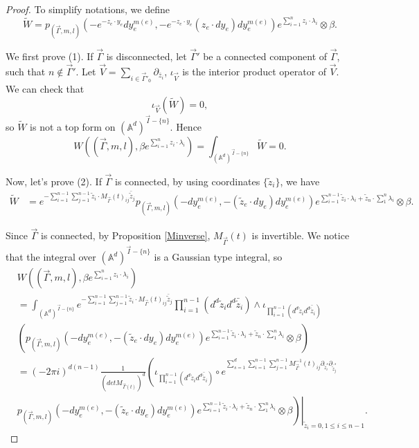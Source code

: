 \documentclass[11pt]{amsart}
\theoremstyle{definition}
\theoremstyle{remark}
\numberwithin{equation}{section}
\begin{document}
\begin{proof}
    To simplify notations, we define
    $$
    \tilde{W}=p_{(\vec{\Gamma},m,l)}(-e^{-z_{e}\cdot y_{e}}dy_{e}^{m(e)},-e^{-z_{e}\cdot y_{e}}(z_{e}\cdot dy_{e})dy_{e}^{m(e)})e^{\sum_{i=1}^{n}z_{i}\cdot\lambda_{i}}\otimes \beta.
    $$

    We first prove (1). If $\vec{\Gamma}$ is disconnected, let $\vec{\Gamma}'$ be a connected component of $\vec{\Gamma}$, such that $n\notin \vec{\Gamma}'$. Let $\vec{V}=\sum_{i\in\vec{\Gamma}'_{0}}\partial_{\bar{z}_{i}}$, $\iota_{\vec{V}}$ is the interior product operator of $\vec{V}$. We can check that
    $$
    \iota_{\vec{V}}(\tilde{W})=0,
    $$
    so $\tilde{W}$ is not a top form on $(\mathbb{A}^d)^{\vec{I}-\{n\}}$. Hence $$
    W((\vec{\Gamma},m,l),\beta e^{\sum_{i=1}^{n}z_{i}\cdot\lambda_{i}})=\int_{(\mathbb{A}^{d})^{\vec{I}-\{n\}}}\tilde{W}=0.
    $$

    Now, let's prove (2). If $\vec{\Gamma}$ is connected, by using coordinates $\{\tilde{z}_{i}\}$, we have
    \begin{align*}
        \tilde{W}&=e^{-\sum_{i=1}^{n-1}\sum_{j=1}^{n-1}\tilde{z}_{i}\cdot M_{\vec{\Gamma}}(t)_{ij}\bar{\tilde{z}}_{j}}p_{(\vec{\Gamma},m,l)}(-dy_{e}^{m(e)},-(\tilde{z}_{e}\cdot dy_{e})dy_{e}^{m(e)})e^{\sum_{i=1}^{n-1}\tilde{z}_{i}\cdot\lambda_{i}+\tilde{z}_{n}\cdot\sum_{1}^{n}\lambda_{i}}\otimes \beta.
    \end{align*}

    Since $\vec{\Gamma}$ is connected, by Proposition \ref{Minverse}, $M_{\vec{\Gamma}}(t)$ is invertible. We notice that the integral over $(\mathbb{A}^d)^{\vec{I}-\{n\}}$ is a Gaussian type integral, so
    \begin{align*}
        &W((\vec{\Gamma},m,l),\beta e^{\sum_{i=1}^{n}z_{i}\cdot\lambda_{i}})\\
        &=\int_{(\mathbb{A}^d)^{\vec{I}-\{n\}}}e^{-\sum_{i=1}^{n-1}\sum_{j=1}^{n-1}\tilde{z}_{i}\cdot M_{\vec{\Gamma}}(t)_{ij}\bar{\tilde{z}}_{j}}\prod_{i=1}^{n-1}(d^{d}\tilde{z}_{i}d^{d}\bar{\tilde{z}}_{i})\wedge \iota_{\prod_{i=1}^{n-1}(d^{d}\tilde{z}_{i}d^{d}\bar{\tilde{z}}_{i})}\\
        &\left(p_{(\vec{\Gamma},m,l)}(-dy_{e}^{m(e)},-(\tilde{z}_{e}\cdot dy_{e})dy_{e}^{m(e)})e^{\sum_{i=1}^{n-1}\tilde{z}_{i}\cdot\lambda_{i}+\tilde{z}_{n}\cdot\sum_{1}^{n}\lambda_{i}}\otimes \beta\right)\\
        &=(-2\pi i)^{d(n-1)}\frac{1}{(detM_{\vec{\Gamma}(t)})^{d}}\left(
        \iota_{\prod_{i=1}^{n-1}(d^{d}\tilde{z}_{i}d^{d}\bar{\tilde{z}}_{i})}
        \circ
        e^{\sum_{s=1}^{d}\sum_{i=1}^{n-1}\sum_{j=1}^{n-1} M^{-1}_{\vec{\Gamma}}(t)_{ij}\partial_{\tilde{z}_{i}^{s}}\partial_{\bar{\tilde{z}}_{j}^{s}}}
        \right.\\
        &\left.\left.p_{(\vec{\Gamma},m,l)}(-dy_{e}^{m(e)},-(\tilde{z}_{e}\cdot dy_{e})dy_{e}^{m(e)})e^{\sum_{i=1}^{n-1}\tilde{z}_{i}\cdot\lambda_{i}+\tilde{z}_{n}\cdot\sum_{1}^{n}\lambda_{i}}\otimes \beta\right)\right|_{\tilde{z}_{i}=0,1\leq i\leq n-1}.
    \end{align*}


\end{proof}
\end{document}
